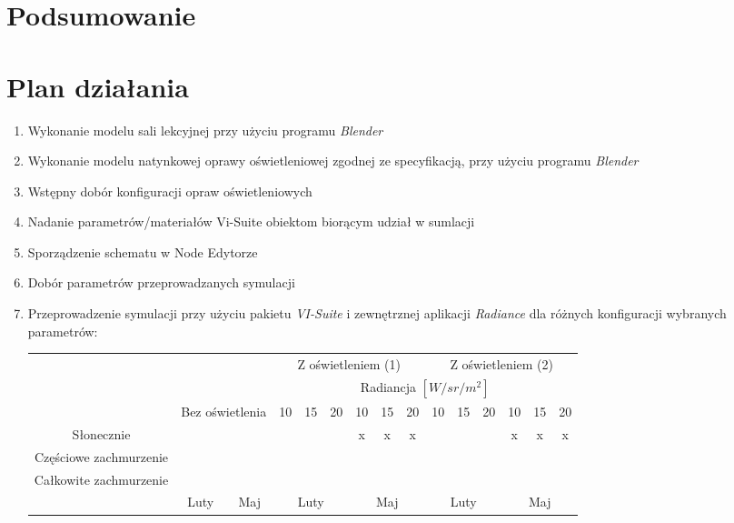 \documentclass[a4paper,12pt]{article}
\begin{document}
	
	\newpage
	\section{Podsumowanie}
	\label{sec:podsumowanie}		

	\section{Plan działania}
	\label{sec:plan_dzialania}
	\begin{enumerate}
		\item Wykonanie modelu sali lekcyjnej przy użyciu programu \emph{Blender} \checkmark
		\item Wykonanie modelu natynkowej oprawy oświetleniowej zgodnej ze specyfikacją, przy użyciu programu \emph{Blender} \checkmark
		\item Wstępny dobór konfiguracji opraw oświetleniowych \checkmark
		\item Nadanie parametrów/materiałów Vi-Suite obiektom biorącym udział w sumlacji \checkmark
		\item Sporządzenie schematu w Node Edytorze \checkmark
		\item Dobór parametrów przeprowadzanych symulacji \checkmark
		\item Przeprowadzenie symulacji przy użyciu pakietu \emph{VI-Suite} i zewnętrznej aplikacji \emph{Radiance} dla różnych konfiguracji wybranych parametrów:
		
		
		\begin{table}[h]
			\begin{center}
				\begin{tabular}{|c|c|c|c|c|c|c|c|c|c|c|c|c|c|c|}
					\cline{4-15}
					\multicolumn{3}{c|}{}&\multicolumn{6}{c|}{Z oświetleniem (1)} & \multicolumn{6}{c|}{Z oświetleniem (2)}\\ \cline{4-15}
					\multicolumn{3}{c|}{} & \multicolumn{12}{c|}{Radiancja $[W/sr/m^2]$} \\ \cline{2-15}
					\multicolumn{1}{c|}{}&\multicolumn{2}{c|}{Bez oświetlenia}& 10&15&20&10&15&20 & 10&15&20&10&15&20\\ \hline
					Słonecznie & \checkmark & \checkmark & \checkmark & \checkmark &\checkmark&x&x&x&\checkmark&\checkmark&\checkmark&x&x&x\\ \hline
					Częściowe zachmurzenie  & \checkmark & \checkmark & \checkmark & \checkmark &\checkmark& \checkmark & \checkmark & \checkmark &\checkmark&\checkmark&\checkmark&\checkmark&\checkmark&\checkmark  \\ \hline
					Całkowite zachmurzenie  & \checkmark & \checkmark & \checkmark & \checkmark & \checkmark & \checkmark & \checkmark & \checkmark &\checkmark&\checkmark&\checkmark&\checkmark&\checkmark&\checkmark \\ \hline
					\multicolumn{1}{c|}{}& Luty & Maj & \multicolumn{3}{c|}{Luty} & \multicolumn{3}{c|}{Maj} &  \multicolumn{3}{c|}{Luty} & \multicolumn{3}{c|}{Maj}\\ \cline{2-15}
					

\end{tabular}
\end{center}
\end{table}
\end{enumerate}
\end{document}
